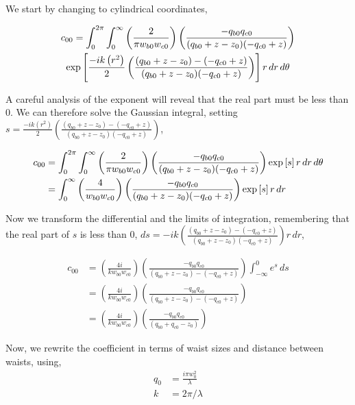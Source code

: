 We start by changing to cylindrical coordinates,

\begin{multline}
    c_{00} = \int^{2 \pi}_{0} \int^{\infty}_{0}  \left( \frac{2}{\pi w_{b0} w_{c0}} \right)
    \left( \frac{- q_{b0} q_{c0}}{(q_{b0}+z-z_0)(-q_{c0}+z)} \right) \\
    \exp \left[
    \frac{-ik \left( r^2  \right)}{2} \left( \frac{(q_{b0}+z-z_0)-(-q_{c0}+z)}{(q_{b0}+z-z_0)(-q_{c0}+z)} \right)
    \right] r \,dr \,d\theta
\end{multline}

A careful analysis of the exponent will reveal that the real part must be less than $0$.
We can therefore solve the Gaussian integral, setting $s =
\frac{-ik \left( r^2  \right)}{2} \left( \frac{(q_{b0}+z-z_0)-(-q_{c0}+z)}{(q_{b0}+z-z_0)(-q_{c0}+z)} \right)
$,

\begin{align}
    c_{00} &= \int^{2 \pi}_{0} \int^{\infty}_{0}  \left( \frac{2}{\pi w_{b0} w_{c0}} \right)
    \left( \frac{- q_{b0} q_{c0}}{(q_{b0}+z-z_0)(-q_{c0}+z)} \right)
    \exp \left[ s
    \right] r \,dr \,d\theta \nonumber
\\  &= \int^{\infty}_{0} \left( \frac{4}{w_{b0} w_{c0}} \right)
    \left( \frac{- q_{b0} q_{c0}}{(q_{b0}+z-z_0)(-q_{c0}+z)} \right)
    \exp \left[ s
    \right] r \,dr
\end{align}

Now we transform the differential and the limits of integration, remembering
that the real part of $s$ is less than $0$, $ds =
-ik \left( \frac{(q_{b0}+z-z_0)-(-q_{c0}+z)}{(q_{b0}+z-z_0)(-q_{c0}+z)} \right) r \,dr
$,

\begin{align}
    c_{00} &= \left( \frac{4i}{k w_{b0} w_{c0}} \right)
    \left( \frac{- q_{b0} q_{c0}}{(q_{b0}+z-z_0)-(-q_{c0}+z)} \right)
    \int^{0}_{-\infty} e^s \,ds \nonumber
\\  &= \left( \frac{4i}{k w_{b0} w_{c0}} \right)
    \left( \frac{- q_{b0} q_{c0}}{(q_{b0}+z-z_0)-(-q_{c0}+z)} \right) \nonumber
\\  &= \left( \frac{4i}{k w_{b0} w_{c0}} \right)
    \left( \frac{- q_{b0} q_{c0}}{(q_{b0}+q_{c0}-z_0)} \right)
\end{align}

Now, we rewrite the coefficient in terms of waist sizes and distance between waists, using,
\begin{align*}
    q_0 &= \frac{i \pi w_0^2}{\lambda}
\\  k &= 2 \pi / \lambda
\end{align*}

